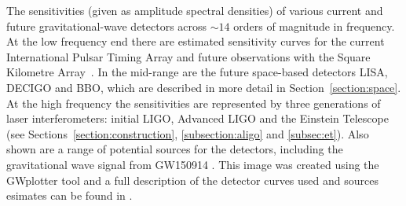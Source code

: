 \label{fig:fullspectrum}
The sensitivities (given as amplitude spectral densities) of various current and future gravitational-wave detectors
    across $\sim14$ orders of magnitude in frequency. At the low
    frequency end there are estimated sensitivity curves for the current International Pulsar Timing Array and future observations with the
    Square Kilometre Array~\cite{SKA}. In the mid-range are the future space-based detectors LISA, DECIGO and BBO, which are
    described in more detail in Section~\ref{section:space}. At the high frequency the sensitivities are
    represented by three generations of laser interferometers: initial LIGO,
    Advanced LIGO and the Einstein Telescope (see
    Sections~\ref{section:construction}, \ref{subsection:aligo} and
    \ref{subsec:et}). Also shown are a range of potential sources for the detectors, including the gravitational wave signal from GW150914 \cite{GW150914}. This image was created using the GWplotter tool \cite{GWplotter} and a full description of the detector curves used and sources esimates can be found in \cite{2015CQGra..32a5014M}.
  
